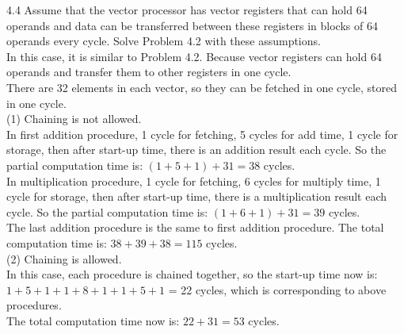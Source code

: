 \documentclass[12pt]{report}
\begin{document}
4.4 Assume that the vector processor has vector registers that can hold 64 operands and data can be transferred between these registers in blocks of 64 operands every cycle. Solve Problem 4.2 with these assumptions. \\
In this case, it is similar to Problem 4.2. Because vector registers can hold 64 operands and transfer them to other registers in one cycle. \\
There are 32 elements in each vector, so they can be fetched in one cycle, stored in one cycle. \\
(1) Chaining is not allowed.\\
In first addition procedure, 1 cycle for fetching, 5 cycles for add time, 1 cycle for storage, then after start-up time, there is an addition result each cycle. So the partial computation time is: $(1 + 5 + 1) + 31 = 38$ cycles.\\
In multiplication procedure, 1 cycle for fetching, 6 cycles for multiply time, 1 cycle for storage, then after start-up time, there is a multiplication result each cycle. So the partial computation time is: $(1 + 6 + 1) + 31 = 39$ cycles.\\
The last addition procedure is the same to first addition procedure.
The total computation time is: $38 + 39 + 38 = 115$ cycles.\\
(2) Chaining is allowed.\\
In this case, each procedure is chained together, so the start-up time now is: $1 + 5 + 1 + 1 + 8 + 1 + 1 + 5 + 1$ = 22 cycles, which is corresponding to above procedures.\\
The total computation time now is: $22 + 31 = 53$ cycles.
\end{document}
